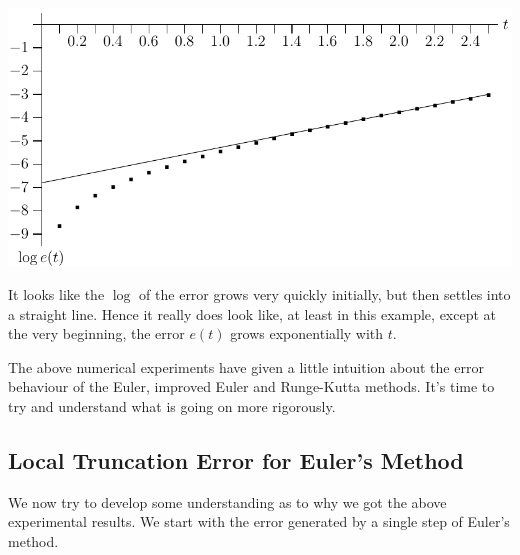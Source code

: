 \begin{wfig}
\begin{center}
    \includegraphics[scale=0.95]{t_log_error.pdf}
\end{center}
\end{wfig}

It looks like the $\log$ of the error grows very quickly initially, but then settles into a straight line. Hence it really does look like, at least in 
this example, except at the very beginning, the error $e(t)$ grows 
exponentially with $t$. 

The above numerical experiments have given a little intuition about the error behaviour of the Euler, improved Euler and Runge-Kutta methods. It's time to try and understand what is going on more rigorously.

\subsection{Local Truncation Error for Euler's Method}
We now try to develop some understanding as to why we got the above experimental
results. We start with the error generated by a single step of Euler's
method.

